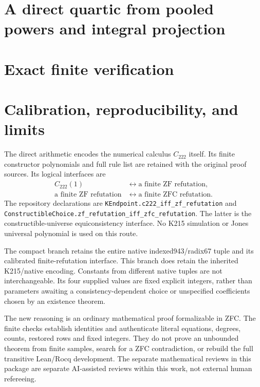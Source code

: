 \documentclass[11pt]{article}
\theoremstyle{remark}\newtheorem{remark}[theorem]{Remark}
\newcommand{\file}[1]{\nolinkurl{#1}}
\begin{document}
\section{A direct quartic from pooled powers and integral projection}\label{sec:quartic}




\section{Exact finite verification}\label{sec:verification}


\section{Calibration, reproducibility, and limits}\label{sec:status}

The direct arithmetic encodes the numerical calculus $C_{222}$ itself.
Its finite constructor polynomials and full rule list are retained with
the original proof sources. Its logical interfaces are
\begin{align*}
 C_{222}(1)&\longleftrightarrow\text{a finite ZF refutation},\\
 \text{a finite ZF refutation}&\longleftrightarrow
                  \text{a finite ZFC refutation}.
\end{align*}
The repository declarations are
\file{KEndpoint.c222_iff_zf_refutation} and
\file{ConstructibleChoice.zf_refutation_iff_zfc_refutation}.
The latter is the constructible-universe equiconsistency interface.
No K215 simulation or Jones universal polynomial is used on this route.

The compact branch retains the entire native indexed943/radix67 tuple
and its calibrated finite-refutation interface. This branch does retain
the inherited K215/native encoding. Constants from different native
tuples are not interchangeable. Its four supplied values are fixed
explicit integers, rather than parameters awaiting a consistency-dependent
choice or unspecified coefficients chosen by an existence theorem.

The new reasoning is an ordinary mathematical proof formalizable in ZFC.
The finite checks establish identities and authenticate literal equations,
degrees, counts, restored rows and fixed integers. They do not prove an
unbounded theorem from finite samples, search for a ZFC contradiction,
or rebuild the full transitive Lean/Rocq development. The separate
mathematical reviews in this package are separate AI-assisted reviews
within this work, not external human refereeing.
\end{document}
